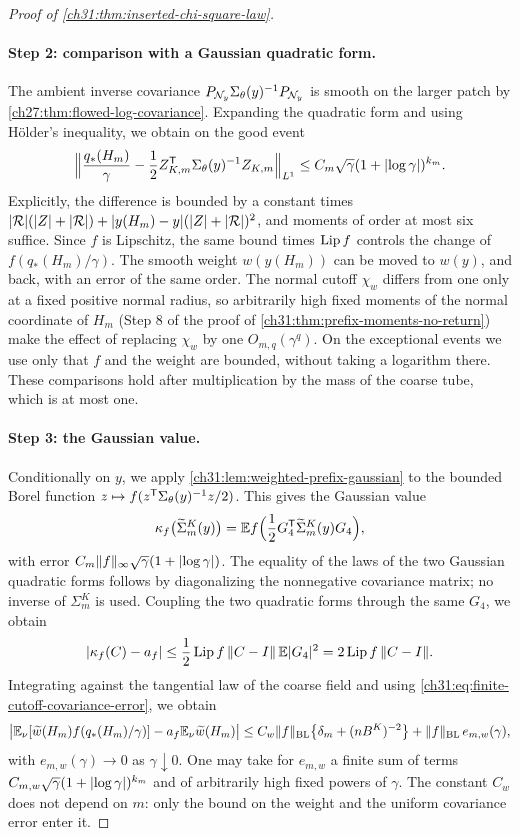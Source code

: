 \begin{proof}[Proof of \cref{ch31:thm:inserted-chi-square-law}]
\paragraph{Step 2: comparison with a Gaussian quadratic form.}
The ambient inverse covariance $P_{\mathcal N_{y}}\Sigma_\theta(y)^{-1}P_{\mathcal N_{y}}$ is smooth on the larger patch by \cref{ch27:thm:flowed-log-covariance}. Expanding the quadratic form and using H\"older's inequality, we obtain on the good event
\[
 \Bigl\lVert\frac{q_*(H_m)}\gamma-\frac12Z_{K,m}^{\mathsf T}\Sigma_\theta(y)^{-1}Z_{K,m}\Bigr\rVert_{L^1}\le C_m\sqrt\gamma(1+\lvert \log\gamma\rvert)^{k_m}.
\]
Explicitly, the difference is bounded by a constant times $\lvert \mathcal R\rvert(\lvert Z\rvert+\lvert \mathcal R\rvert)+\lvert y(H_m)-y\rvert(\lvert Z\rvert+\lvert \mathcal R\rvert)^2$, and moments of order at most six suffice. Since $f$ is Lipschitz, the same bound times $\operatorname{Lip} f$ controls the change of $f(q_*(H_m)/\gamma)$. The smooth weight $w(y(H_m))$ can be moved to $w(y)$, and back, with an error of the same order. The normal cutoff $\chi_w$ differs from one only at a fixed positive normal radius, so arbitrarily high fixed moments of the normal coordinate of $H_m$ (Step 8 of the proof of \cref{ch31:thm:prefix-moments-no-return}) make the effect of replacing $\chi_w$ by one $O_{m,q}(\gamma^q)$. On the exceptional events we use only that $f$ and the weight are bounded, without taking a logarithm there. These comparisons hold after multiplication by the mass of the coarse tube, which is at most one.

\paragraph{Step 3: the Gaussian value.}
Conditionally on $y$, we apply \cref{ch31:lem:weighted-prefix-gaussian} to the bounded Borel function $z\mapsto f(z^{\mathsf T}\Sigma_\theta(y)^{-1}z/2)$. This gives the Gaussian value
\[
 \kappa_f\bigl(\widetilde\Sigma_m^K(y)\bigr)=\mathbb E f\Bigl(\frac12G_4^{\mathsf T}\widetilde\Sigma_m^K(y)G_4\Bigr),
\]
with error $C_m\lVert f\rVert_\infty\sqrt\gamma(1+\lvert \log\gamma\rvert)$. The equality of the laws of the two Gaussian quadratic forms follows by diagonalizing the nonnegative covariance matrix; no inverse of $\Sigma_m^K$ is used. Coupling the two quadratic forms through the same $G_4$, we obtain
\[
 \lvert \kappa_f(C)-a_f\rvert\le\frac12\operatorname{Lip} f\,\lVert C-I\rVert\,\mathbb E\lvert G_4\rvert^2=2\operatorname{Lip} f\,\lVert C-I\rVert.
\]
Integrating against the tangential law of the coarse field and using \eqref{ch31:eq:finite-cutoff-covariance-error}, we obtain
\begin{equation}\label{ch31:eq:prefix-inserted-distribution}
 \bigl\lvert\mathbb E_\nu[\widetilde w(H_m)f(q_*(H_m)/\gamma)]-a_f\mathbb E_\nu\widetilde w(H_m)\bigr\rvert
 \le C_w\lVert f\rVert_{\rm BL}\bigl\{\delta_m+(nB^K)^{-2}\bigr\}+\lVert f\rVert_{\rm BL}\,e_{m,w}(\gamma),
\end{equation}
with $e_{m,w}(\gamma)\to0$ as $\gamma\downarrow0$. One may take for $e_{m,w}$ a finite sum of terms $C_{m,w}\sqrt\gamma(1+\lvert \log\gamma\rvert)^{k_m}$ and of arbitrarily high fixed powers of $\gamma$. The constant $C_w$ does not depend on $m$: only the bound on the weight and the uniform covariance error enter it.


\end{proof}
